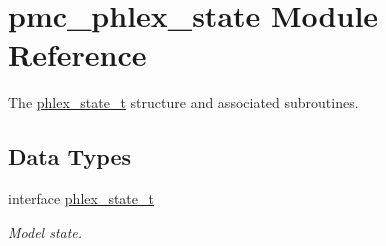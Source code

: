 \hypertarget{namespacepmc__phlex__state}{}\section{pmc\+\_\+phlex\+\_\+state Module Reference}
\label{namespacepmc__phlex__state}


The \mbox{\hyperlink{structpmc__phlex__state_1_1phlex__state__t}{phlex\+\_\+state\+\_\+t}} structure and associated subroutines.  


\subsection*{Data Types}
\begin{DoxyCompactItemize}
\item 
interface \mbox{\hyperlink{structpmc__phlex__state_1_1phlex__state__t}{phlex\+\_\+state\+\_\+t}}
\begin{DoxyCompactList}\small\item\em Model state. \end{DoxyCompactList}\end{DoxyCompactItemize}

